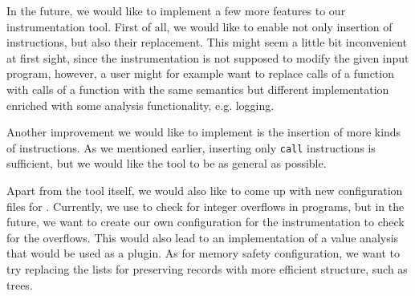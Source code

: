 In the future, we would like to implement a few more features to our
instrumentation tool. First of all, we would like to enable not only insertion
of instructions, but also their replacement. This might seem a little bit
inconvenient at first sight, since the instrumentation is not supposed to
modify the given input program, however, a user might for example want to
replace calls of a function with calls of a function with the same semantics
but different implementation enriched with some analysis functionality, e.g.
logging.

Another improvement we would like to implement is the insertion of more kinds of
instructions. As we mentioned earlier, inserting only \texttt{call}
instructions is sufficient, but we would like the tool to be as general as
possible.

Apart from the tool itself, we would also like to come up with new
configuration files for \symbiotic. Currently, we use \clang to check for
integer overflows in programs, but in the future, we want to create our own
configuration for the instrumentation to check for the overflows. This would
also lead to an implementation of a value analysis that would be used as a plugin.
As for memory safety configuration, we want to try replacing the lists for
preserving records with more efficient structure, such as trees.
